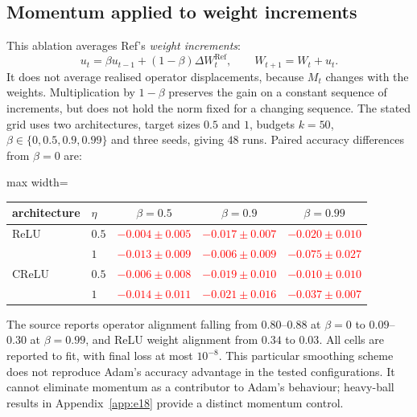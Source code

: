 \documentclass{article}
\newcommand{\nat}[1]{\textcolor{red}{#1}}
\theoremstyle{definition}
\theoremstyle{remark}
\begin{document}
\subsection{Momentum applied to weight increments}\label{app:e15}

This ablation averages Ref's \emph{weight increments}:
\[
 u_t=\beta u_{t-1}+(1-\beta)\Delta W_t^{\mathrm{Ref}},\qquad W_{t+1}=W_t+u_t.
\]
It does not average realised operator displacements, because $M_t$ changes with the weights. Multiplication by $1-\beta$ preserves the gain on a constant sequence of increments, but does not hold the norm fixed for a changing sequence. The stated grid uses two architectures, target sizes $0.5$ and $1$, budgets $k=50$, $\beta\in\{0,0.5,0.9,0.99\}$ and three seeds, giving $48$ runs. Paired accuracy differences from $\beta=0$ are:

\begin{center}\small
\begin{adjustbox}{max width=\linewidth}
\begin{tabular}{llccc}
\toprule
architecture & $\eta$ & $\beta = 0.5$ & $\beta = 0.9$ & $\beta = 0.99$ \\
\midrule
ReLU  & $0.5$ & \nat{$-0.004 \pm 0.005$} & \nat{$-0.017 \pm 0.007$} & \nat{$-0.020 \pm 0.010$} \\
      & $1$   & \nat{$-0.013 \pm 0.009$} & \nat{$-0.006 \pm 0.009$} & \nat{$\mathbf{-0.075 \pm 0.027}$} \\
CReLU & $0.5$ & \nat{$-0.006 \pm 0.008$} & \nat{$-0.019 \pm 0.010$} & \nat{$-0.010 \pm 0.010$} \\
      & $1$   & \nat{$-0.014 \pm 0.011$} & \nat{$-0.021 \pm 0.016$} & \nat{$\mathbf{-0.037 \pm 0.007}$} \\
\bottomrule
\end{tabular}
\end{adjustbox}
\end{center}

The source reports operator alignment falling from $0.80$--$0.88$ at $\beta=0$ to $0.09$--$0.30$ at $\beta=0.99$, and ReLU weight alignment from $0.34$ to $0.03$. All cells are reported to fit, with final loss at most $10^{-8}$. This particular smoothing scheme does not reproduce Adam's accuracy advantage in the tested configurations. It cannot eliminate momentum as a contributor to Adam's behaviour; heavy-ball results in Appendix~\ref{app:e18} provide a distinct momentum control.
\end{document}
